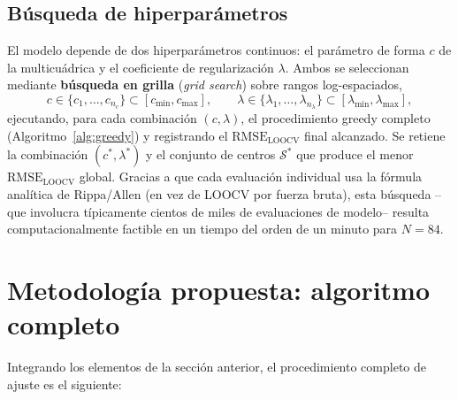 \documentclass[11pt,a4paper]{article}
\begin{document}
\subsection{B\'usqueda de hiperpar\'ametros}

El modelo depende de dos hiperpar\'ametros continuos: el par\'ametro de forma
$c$ de la multicu\'adrica y el coeficiente de regularizaci\'on $\lambda$.
Ambos se seleccionan mediante \textbf{b\'usqueda en grilla}
(\emph{grid search}) sobre rangos log-espaciados,
\[
c \in \{c_1,\dots,c_{n_c}\} \subset [c_{\min}, c_{\max}], \qquad
\lambda \in \{\lambda_1,\dots,\lambda_{n_\lambda}\} \subset
[\lambda_{\min},\lambda_{\max}],
\]
ejecutando, para cada combinaci\'on $(c,\lambda)$, el procedimiento greedy
completo (Algoritmo~\ref{alg:greedy}) y registrando el
$\text{RMSE}_{\text{LOOCV}}$ final alcanzado. Se retiene la combinaci\'on
$(c^\ast,\lambda^\ast)$ y el conjunto de centros $\mathcal{S}^\ast$ que
produce el menor $\text{RMSE}_{\text{LOOCV}}$ global. Gracias a que cada
evaluaci\'on individual usa la f\'ormula anal\'itica de Rippa/Allen (en vez de
LOOCV por fuerza bruta), esta b\'usqueda --que involucra t\'ipicamente
cientos de miles de evaluaciones de modelo-- resulta computacionalmente
factible en un tiempo del orden de un minuto para $N=84$.

\section{Metodolog\'ia propuesta: algoritmo completo}

Integrando los elementos de la secci\'on anterior, el procedimiento completo
de ajuste es el siguiente:
\end{document}
